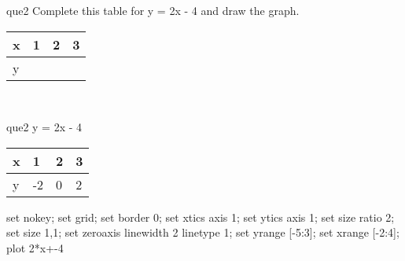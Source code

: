 \documentclass[13.5pt, varwidth=true]{beamer}
\begin{document}
\begin{frame}[shrink=19,fragile]
	\begin{beamercolorbox}[rounded=true, left, shadow=true,wd=14.8cm]{que2}
		 Complete this table for y = 2x - 4 and draw the graph. \\[0.3cm] \renewcommand{\arraystretch}{1.2}\begin{tabular}{|C|C|C|C|} \hline x & 1 & 2 & 3 \\ \hline y & & & \\ \hline \end{tabular}\\[0.3cm]
	\end{beamercolorbox}
\end{frame}
\begin{frame}[shrink=19,fragile]
	\begin{beamercolorbox}[rounded=true, left, shadow=true,wd=14.8cm]{que2}
		y = 2x - 4\renewcommand{\arraystretch}{1.2}\begin{tabular}{|C|C|C|C|} \hline x & 1 & 2 & 3 \\ \hline y & -2 & 0 & 2\\ \hline \end{tabular}\begin{gnuplot}[terminal=pdf] set nokey; set grid; set border 0; set xtics axis 1; set ytics axis 1; set size ratio 2; set size 1,1; set zeroaxis linewidth 2 linetype 1; set yrange [-5:3]; set xrange [-2:4]; plot 2*x+-4 \end{gnuplot}
	\end{beamercolorbox}
\end{frame}
\end{document}
